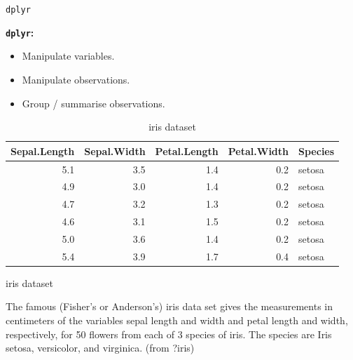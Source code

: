 \documentclass[14pt,ignorenonframetext,]{bredelebeamer}
\providecommand{\tightlist}{%
  \setlength{\itemsep}{0pt}\setlength{\parskip}{0pt}}
\begin{document}
\begin{frame}[fragile]{\texttt{dplyr}}

\textbf{\texttt{dplyr}:}

\begin{itemize}
\tightlist
\item
  Manipulate variables.
\item
  Manipulate observations.
\item
  Group / summarise observations.
\end{itemize}

\begin{center}
\begin{table}[t]

\caption{\label{tab:unnamed-chunk-20}iris dataset}
\centering
\begin{tabular}{r|r|r|r|l}
\hline
Sepal.Length & Sepal.Width & Petal.Length & Petal.Width & Species\\
\hline
5.1 & 3.5 & 1.4 & 0.2 & setosa\\
\hline
4.9 & 3.0 & 1.4 & 0.2 & setosa\\
\hline
4.7 & 3.2 & 1.3 & 0.2 & setosa\\
\hline
4.6 & 3.1 & 1.5 & 0.2 & setosa\\
\hline
5.0 & 3.6 & 1.4 & 0.2 & setosa\\
\hline
5.4 & 3.9 & 1.7 & 0.4 & setosa\\
\hline
\end{tabular}
\end{table}
\end{center}

\begin{block}{iris dataset}

The famous (Fisher's or Anderson's) iris data set gives the measurements
in centimeters of the variables sepal length and width and petal length
and width, respectively, for 50 flowers from each of 3 species of iris.
The species are Iris setosa, versicolor, and virginica. (from ?iris)

\end{block}

\end{frame}
\end{document}
